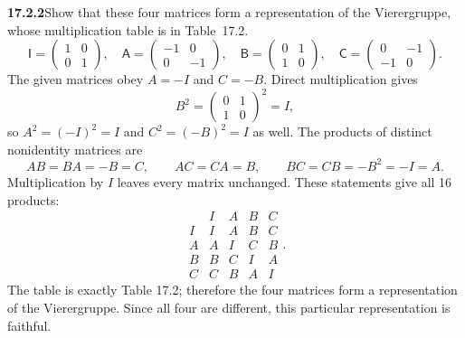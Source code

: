 \par\bigskip
\noindent\textbf{17.2.2}\quad Show that these four matrices form a
representation of the Vierergruppe, whose multiplication table is in
Table~17.2.
\[
\mathsf{I}=\begin{pmatrix}1&0\\0&1\end{pmatrix},\quad
\mathsf{A}=\begin{pmatrix}-1&0\\0&-1\end{pmatrix},\quad
\mathsf{B}=\begin{pmatrix}0&1\\1&0\end{pmatrix},\quad
\mathsf{C}=\begin{pmatrix}0&-1\\-1&0\end{pmatrix}.
\]
\solution
The given matrices obey $A=-I$ and $C=-B$. Direct multiplication gives
\[
B^2=\begin{pmatrix}0&1\\1&0\end{pmatrix}^2=I,
\]
so $A^2=(-I)^2=I$ and $C^2=(-B)^2=I$ as well.
The products of distinct nonidentity matrices are
\[
AB=BA=-B=C,\qquad AC=CA=B,\qquad
BC=CB=-B^2=-I=A.
\]
Multiplication by $I$ leaves every matrix unchanged. These statements
give all 16 products:
\[
\begin{array}{c|cccc}
&I&A&B&C\\\hline
I&I&A&B&C\\
A&A&I&C&B\\
B&B&C&I&A\\
C&C&B&A&I
\end{array}.
\]
The table is exactly Table 17.2; therefore the four matrices form
a representation of the Vierergruppe. Since all four are different,
this particular representation is faithful.

